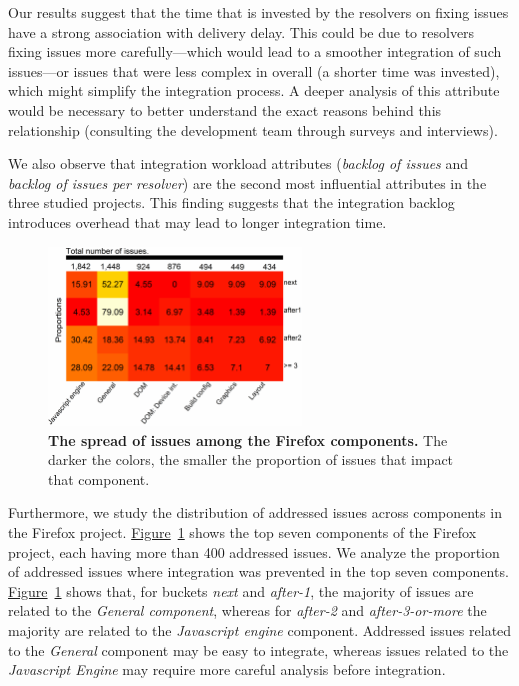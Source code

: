 Our results suggest that the time that is invested by the resolvers on fixing
issues have a strong association with delivery delay. This could be due to
resolvers fixing issues more carefully---which would lead to a smoother
integration of such issues---or issues that were less complex in overall (\eg a
shorter time was invested), which might simplify the integration process. A deeper
analysis of this attribute would be necessary to better understand the exact
reasons behind this relationship (\eg consulting the development team through
surveys and interviews). 

We also observe that integration workload attributes (\ie \textit{backlog of
issues} and \textit{backlog of issues per resolver}) are the second most
influential attributes in the three studied projects. This finding suggests that
the integration backlog introduces overhead that may lead to longer integration
time.

\begin{figure}[!t]
	\centering
	\includegraphics[width=0.60\textwidth,keepaspectratio]
	{chapters/chapter4/figures/firefox/RQ3_component_hm.pdf}
	\caption{\textbf{The spread of issues among the Firefox components.} The
		darker the colors, the smaller the proportion of issues that
	impact that component.}
	\label{ch4:fig:componentHeatmap}
\end{figure}

Furthermore, we study the distribution of addressed issues across components in the
Firefox project.
\hyperref[ch4:fig:componentHeatmap]{Figure}~\ref{ch4:fig:componentHeatmap} shows the top
seven components of the Firefox project, each having more than 400 addressed issues.
We analyze the proportion of addressed issues where integration was prevented in the
top seven components.
\hyperref[ch4:fig:componentHeatmap]{Figure}~\ref{ch4:fig:componentHeatmap} shows that,
for buckets \textit{next} and \textit{after-1}, the majority of issues are
related to the \textit{General component}, whereas for \textit{after-2} and
\textit{after-3-or-more} the majority are related to the \textit{Javascript
engine} component. Addressed issues related to the \textit{General} component
may be easy to integrate, whereas issues related to the \textit{Javascript
Engine} may require more careful analysis before integration.  \\



